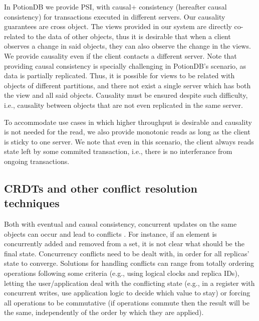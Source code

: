In PotionDB we provide PSI, with causal+ consistency (hereafter causal consistency) for transactions executed in different servers. Our causality guarantees are cross object.
The views provided in our system are directly co-related to the data of other objects, thus it is desirable that when a client observes a change in said objects, they can also observe the change in the views.
We provide causality even if the client contacts a different server.
Note that providing causal consistency is specially challenging in PotionDB's scenario, as data is partially replicated.
Thus, it is possible for views to be related with objects of different partitions, and there not exist a single server which has both the view and all said objects.
Causality must be ensured despite such difficulty, i.e., causality between objects that are not even replicated in the same server.

To accommodate use cases in which higher throughput is desirable and causality is not needed for the read, we also provide monotonic reads as long as the client is sticky to one server.
We note that even in this scenario, the client always reads state left by some commited transaction, i.e., there is no interferance  from ongoing transactions.

\subsection{CRDTs and other conflict resolution techniques}
\label{subsec:crdt}

Both with eventual and causal consistency, concurrent updates on the same objects can occur and lead to conflicts \cite{understandingEC}.
For instance, if an element is concurrently added and removed from a set, it is not clear what should be the final state.
Concurrency conflicts need to be dealt with, in order for all replicas' state to converge.
Solutions for handling conflicts can range from totally ordering operations following some criteria (e.g., using logical clocks and replica IDs), letting the user/application deal with the conflicting state (e.g., in a register with concurrent writes, use application logic to decide which value to stay) or forcing all operations to be commutative (if operations commute then the result will be the same, independently of the order by which they are applied).

